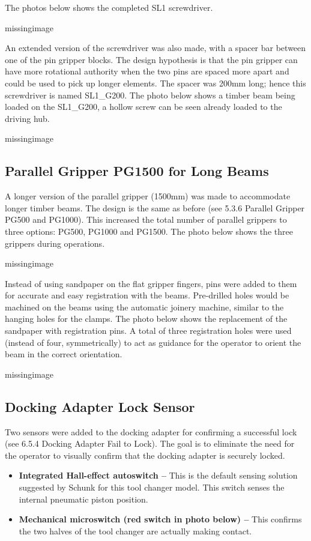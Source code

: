 The photos below shows the completed SL1 screwdriver. 

missingimage

An extended version of the screwdriver was also made, with a spacer bar between one of the pin gripper blocks. The design hypothesis is that the pin gripper can have more rotational authority when the two pins are spaced more apart and could be used to pick up longer elements. The spacer was 200mm long; hence this screwdriver is named SL1\_G200. The photo below shows a timber beam being loaded on the SL1\_G200, a hollow screw can be seen already loaded to the driving hub.

missingimage

\subsection{Parallel Gripper PG1500 for Long Beams}
A longer version of the parallel gripper (1500mm) was made to accommodate longer timber beams. The design is the same as before (see 5.3.6 Parallel Gripper PG500 and PG1000). This increased the total number of parallel grippers to three options: PG500, PG1000 and PG1500. The photo below shows the three grippers during operations.

missingimage

Instead of using sandpaper on the flat gripper fingers, pins were added to them for accurate and easy registration with the beams. Pre-drilled holes would be machined on the beams using the automatic joinery machine, similar to the hanging holes for the clamps. The photo below shows the replacement of the sandpaper with registration pins. A total of three registration holes were used (instead of four, symmetrically) to act as guidance for the operator to orient the beam in the correct orientation. 

missingimage

\subsection{Docking Adapter Lock Sensor}
Two sensors were added to the docking adapter for confirming a successful lock (see 6.5.4 Docking Adapter Fail to Lock). The goal is to eliminate the need for the operator to visually confirm that the docking adapter is securely locked.

\begin{itemize}
    \item \textbf{Integrated Hall-effect autoswitch --} This is the default sensing solution suggested by Schunk for this tool changer model. This switch senses the internal pneumatic piston position.
    \item \textbf{Mechanical microswitch (red switch in photo below) --} This confirms the two halves of the tool changer are actually making contact.
\end{itemize}

